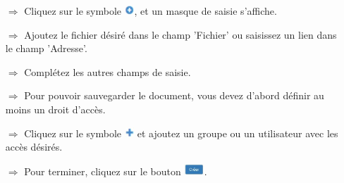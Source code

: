 \documentclass{article}
\begin{document}
\begin{multicols}{2}

\begin{tcolorbox}[colback=blue!5,colframe=blue!40!black,title=Charger des documents]
\begin{itemize}
  \item[$\Longrightarrow$] Cliquez sur le symbole \includegraphics[height=10pt]{Icons/Plussymbol.jpg}, et un masque de saisie s'affiche.
  \item[$\Longrightarrow$] Ajoutez le fichier désiré dans le champ 'Fichier' ou saisissez un lien dans le champ 'Adresse'.
  \item[$\Longrightarrow$] Complétez les autres champs de saisie.
  \item[$\Longrightarrow$] Pour pouvoir sauvegarder le document, vous devez d'abord définir au moins un droit d'accès. 
	\item[$\Longrightarrow$] Cliquez sur le symbole \includegraphics[height=10pt]{Icons/Pluszeichen.jpg} et ajoutez un groupe ou un utilisateur avec les accès désirés.
	\item[$\Longrightarrow$] Pour terminer, cliquez sur le bouton \includegraphics[height=12pt]{Icons/B_Erstellen.jpg}.
\end{itemize}
\end{tcolorbox}



\end{multicols}
\end{document}
